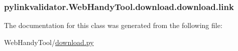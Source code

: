\subsubsection[{link}]{\setlength{\rightskip}{0pt plus 5cm}pylinkvalidator.\+Web\+Handy\+Tool.\+download.\+download.\+link}\hypertarget{classpylinkvalidator_1_1_web_handy_tool_1_1download_1_1download_ae797f56e959b627f4146563aaf63353a}{}\label{classpylinkvalidator_1_1_web_handy_tool_1_1download_1_1download_ae797f56e959b627f4146563aaf63353a}


The documentation for this class was generated from the following file\+:\begin{DoxyCompactItemize}
\item 
Web\+Handy\+Tool/\hyperlink{download_8py}{download.\+py}\end{DoxyCompactItemize}
